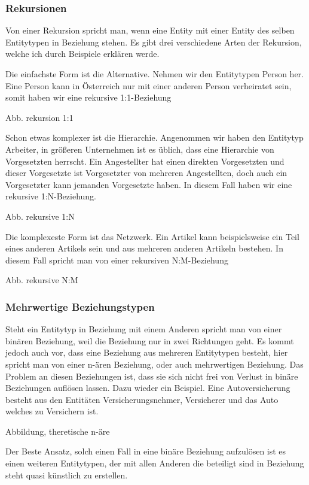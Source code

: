 \begin{flushleft}
\subsubsection{Rekursionen}
Von einer Rekursion spricht man, wenn eine Entity mit einer Entity des selben Entitytypen in Beziehung stehen. Es gibt drei verschiedene Arten der Rekursion, welche ich durch Beispiele erklären werde. 

Die einfachste Form ist die Alternative. Nehmen wir den Entitytypen Person her. Eine Person kann in Österreich nur mit einer anderen Person verheiratet sein, somit haben wir eine rekursive 1:1-Beziehung

Abb. rekursion 1:1

Schon etwas komplexer ist die Hierarchie. Angenommen wir haben den Entitytyp Arbeiter, in größeren Unternehmen ist es üblich, dass eine Hierarchie von Vorgesetzten herrscht. Ein Angestellter hat einen direkten Vorgesetzten und dieser Vorgesetzte ist Vorgesetzter von mehreren Angestellten, doch auch ein Vorgesetzter kann jemanden Vorgesetzte haben. In diesem Fall haben wir eine rekursive 1:N-Beziehung.

Abb. rekursive 1:N

Die komplexeste Form ist das Netzwerk. Ein Artikel kann beispielsweise ein Teil eines anderen Artikels sein und aus mehreren anderen Artikeln bestehen. In diesem Fall spricht man von einer rekursiven N:M-Beziehung

Abb. rekursive N:M

\subsubsection{Mehrwertige Beziehungstypen}

Steht ein Entitytyp in Beziehung mit einem Anderen spricht man von einer binären Beziehung, weil die Beziehung nur in zwei Richtungen geht. Es kommt jedoch auch vor, dass eine Beziehung aus mehreren Entitytypen besteht, hier spricht man von einer n-ären Beziehung, oder auch mehrwertigen Beziehung. Das Problem an diesen Beziehungen ist, dass sie sich nicht frei von Verlust in binäre Beziehungen auflösen lassen. Dazu wieder ein Beispiel. Eine Autoversicherung besteht aus den Entitäten Versicherungsnehmer, Versicherer und das Auto welches zu Versichern ist.

Abbildung, theretische n-äre

Der Beste Ansatz, solch einen Fall in eine binäre Beziehung aufzulösen ist es einen weiteren Entitytypen, der mit allen Anderen die beteiligt sind in Beziehung steht quasi künstlich zu erstellen.


\end{flushleft}
